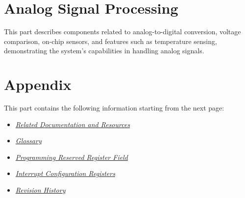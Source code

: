 \documentclass[openany, 10pt]{book}
\begin{document}
\part{Analog Signal Processing}


This part describes components related to analog-to-digital conversion, voltage comparison, on-chip sensors, and features such as temperature sensing, demonstrating the system's capabilities in handling analog signals.






\part{Appendix}\label{appendix}

This part contains the following information starting from the next page:

\begin{itemize}
    \item \hyperref[sec:resources]{\textit{Related Documentation and Resources}}
    \item \hyperref[glossary]{\textit{Glossary}}
    \item \hyperref[programming-reserved-field]{\textit{Programming Reserved Register Field}}
    \item \hyperref[interrupt-config-registers]{\textit{Interrupt Configuration Registers}}
    \item \hyperref[revision-history]{\textit{Revision History}}
\end{itemize}


\clearpage


\clearpage


\clearpage


\clearpage


\clearpage


\clearpage

\end{document}
